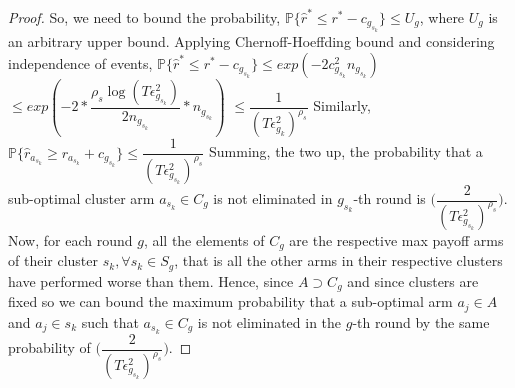 \begin{proof}
	So, we need to bound the probability,
\newline\hspace*{4em} $\mathbb{P}\lbrace\hat{r}^{*}\leq r^{*} - c_{g_{s_{k}}}\rbrace\leq U_{g}$, where $U_{g}$ is an  arbitrary upper bound.
\newline
Applying Chernoff-Hoeffding bound and considering independence of events,
\newline
\newline\hspace*{0em} $\mathbb{P}\lbrace\hat{r}^{*}\leq r^{*} - c_{g_{s_{k}}}\rbrace\leq exp(-2c_{g_{s_{k}}}^{2}n_{g_{s_{k}}})$
\newline\hspace*{8em} $\leq exp(-2 * \dfrac{\rho_{s}\log ( T\epsilon_{g_{s_{k}}}^{2})}{2 n_{g_{s_{k}}}} *n_{g_{s_{k}}})$
\newline\hspace*{8em} $\leq \dfrac{1}{(T\epsilon_{g_{k}}^{2})^{\rho_{s}}}$
\newline
Similarly, $\mathbb{P}\lbrace\hat{r}_{a_{s_{k}}}\geq r_{a_{s_{k}}} + c_{g_{s_{k}}}\rbrace\leq \dfrac{1}{(T\epsilon_{g_{s_{k}}}^{2})^{\rho_{s}}}$
\newline
Summing, the two up, the probability that a sub-optimal cluster arm $a_{s_{k}}\in C_{g}$ is not eliminated in $g_{s_{k}}$-th round is  $\bigg(\dfrac{2}{(T\epsilon_{g_{s_{k}}}^{2})^{\rho_{s}}}\bigg)$. 
\newline Now, for each round $g$, all the elements of $C_{g}$ are the respective max payoff arms of their cluster $s_{k}, \forall s_{k}\in S_{g}$, that is all the other arms in their respective clusters have performed worse than them. Hence, since $A\supset C_{g}$ and since clusters are fixed so we can bound the maximum probability that a sub-optimal arm $a_{j}\in A$  and $a_{j}\in s_{k}$ such that $a_{s_{k}}\in C_{g}$ is not eliminated in the $g$-th round by the same probability of $\bigg(\dfrac{2}{(T\epsilon_{g_{s_{k}}}^{2})^{\rho_{s}}}\bigg)$. 

\end{proof}
